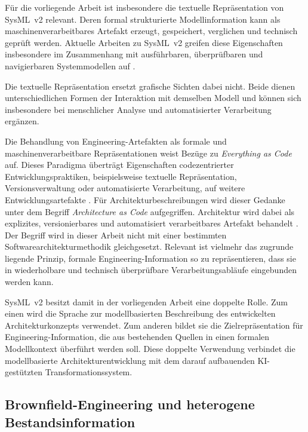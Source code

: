 Für die vorliegende Arbeit ist insbesondere die textuelle Repräsentation von
SysML~v2 relevant. Deren formal strukturierte Modellinformation kann als
maschinenverarbeitbares Artefakt erzeugt, gespeichert, verglichen und
technisch geprüft werden. Aktuelle Arbeiten zu SysML~v2 greifen diese
Eigenschaften insbesondere im Zusammenhang mit ausführbaren, überprüfbaren
und navigierbaren Systemmodellen auf \cite{Teodorov2025}. 

\noindent 
Die textuelle
Repräsentation ersetzt grafische Sichten dabei nicht. Beide dienen
unterschiedlichen Formen der Interaktion mit demselben Modell und können sich
insbesondere bei menschlicher Analyse und automatisierter Verarbeitung
ergänzen.

Die Behandlung von Engineering-Artefakten als formale und
maschinenverarbeitbare Repräsentationen weist Bezüge zu
\emph{Everything as Code} auf. Dieses Paradigma überträgt Eigenschaften
codezentrierter Entwicklungspraktiken, beispielsweise textuelle
Repräsentation, Versionsverwaltung oder automatisierte Verarbeitung, auf
weitere Entwicklungsartefakte \cite{Stirbu2022}. Für
Architekturbeschreibungen wird dieser Gedanke unter dem Begriff
\emph{Architecture as Code} aufgegriffen. Architektur wird dabei als
explizites, versionierbares und automatisiert verarbeitbares Artefakt
behandelt \cite{Bucaioni2025}. Der Begriff wird in dieser Arbeit nicht mit
einer bestimmten Softwarearchitekturmethodik gleichgesetzt. Relevant ist
vielmehr das zugrunde liegende Prinzip, formale Engineering-Information so zu
repräsentieren, dass sie in wiederholbare und technisch überprüfbare
Verarbeitungsabläufe eingebunden werden kann.

SysML~v2 besitzt damit in der vorliegenden Arbeit eine doppelte Rolle. Zum
einen wird die Sprache zur modellbasierten Beschreibung des entwickelten
Architekturkonzepts verwendet. Zum anderen bildet sie die Zielrepräsentation
für Engineering-Information, die aus bestehenden Quellen in einen formalen
Modellkontext überführt werden soll. Diese doppelte Verwendung verbindet die
modellbasierte Architekturentwicklung mit dem darauf aufbauenden
KI-gestützten Transformationssystem.

\subsection{Brownfield-Engineering und heterogene Bestandsinformation}
\label{sec:brownfield}

